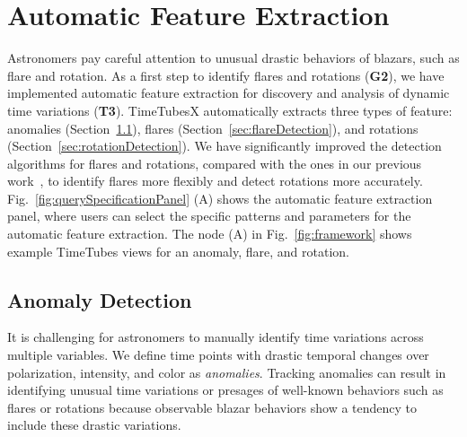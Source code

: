 \section{Automatic Feature Extraction}\label{sec:automaticExtraction}
Astronomers pay careful attention to unusual drastic behaviors of blazars, such as flare and rotation.
As a first step to identify flares and rotations (\textbf{G2}),
we have implemented automatic feature extraction for discovery and analysis of dynamic time variations (\textbf{T3}).
TimeTubesX automatically extracts three types of feature: anomalies (Section~\ref{sec:anomalyDetection}), flares (Section~\ref{sec:flareDetection}), and rotations (Section~\ref{sec:rotationDetection}).
We have significantly improved the detection algorithms for flares and rotations, compared with the ones in our previous work~\cite{Sawada2018}, 
to identify flares more flexibly and detect rotations more accurately.
Fig.~\ref{fig:querySpecificationPanel} (A) shows the automatic feature extraction panel, %
where users can select the specific patterns and parameters for the automatic feature extraction.
The node (A) in Fig.~\ref{fig:framework} shows example TimeTubes views for an anomaly, flare, and rotation.

\subsection{Anomaly Detection}\label{sec:anomalyDetection}
It is challenging for astronomers to manually identify time variations across multiple variables. 
We define time points with drastic temporal changes over polarization, intensity, and color as \textit{anomalies}.
Tracking anomalies can result in identifying unusual time variations or presages of well-known behaviors such as flares or rotations
because observable blazar behaviors show a tendency to include these drastic variations.

